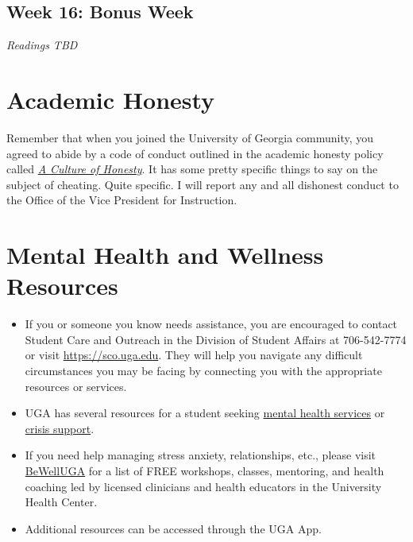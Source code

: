 \documentclass[11pt, letterpaper]{article}
\begin{document}
\subsection*{Week 16: Bonus Week}

\textit{Readings TBD}


\section*{Academic Honesty}

Remember that when you joined the University of Georgia community, you agreed to abide by a code of conduct outlined in the academic honesty policy called \href{https://honesty.uga.edu/Academic-Honesty-Policy/Introduction/}{\textit{A Culture of Honesty}}. It has some pretty specific things to say on the subject of cheating. Quite specific. I will report any and all dishonest conduct to the Office of the Vice President for Instruction.

\section*{Mental Health and Wellness Resources}

\begin{itemize}
	\item If you or someone you know needs assistance, you are encouraged to contact Student Care and Outreach in the Division of Student Affairs at 706-542-7774 or visit \href{https://sco.uga.edu}{https://sco.uga.edu}. They will help you navigate any difficult circumstances you may be facing by connecting you with the appropriate resources or services. 
	\item UGA has several resources for a student seeking \href{https://www.uhs.uga.edu/bewelluga/bewelluga}{mental health services} or \href{https://www.uhs.uga.edu/info/emergencies}{crisis support}. 
	\item If you need help managing stress anxiety, relationships, etc., please visit \href{https://www.uhs.uga.edu/bewelluga/bewelluga}{BeWellUGA} for a list of FREE workshops, classes, mentoring, and health coaching led by licensed clinicians and health educators in the University Health Center.
	\item Additional resources can be accessed through the UGA App.
\end{itemize}


\end{document}
